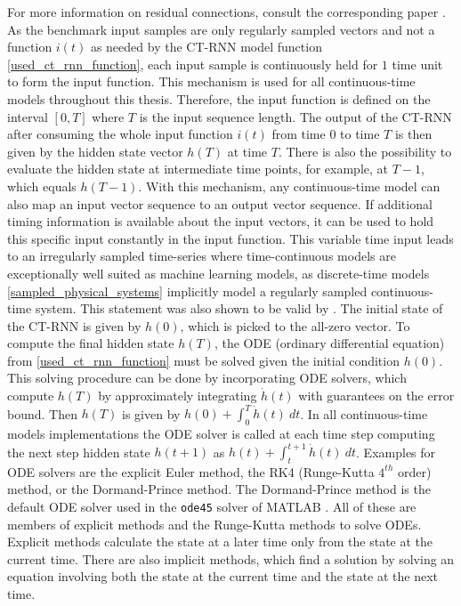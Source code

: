 \documentclass[draft,final]{vutinfth} %
\begin{document}
    For more information on residual connections, consult the corresponding paper \cite{ResNet}.
    As the benchmark input samples are only regularly sampled vectors and not a function $i(t)$ as needed by the CT-RNN model function \ref{used_ct_rnn_function}, each input sample is continuously held for $1$ time unit to form the input function.
    This mechanism is used for all continuous-time models throughout this thesis.
    Therefore, the input function is defined on the interval $[0, T]$ where $T$ is the input sequence length.
    The output of the CT-RNN after consuming the whole input function $i(t)$ from time $0$ to time $T$ is then given by the hidden state vector $h(T)$ at time $T$.
    There is also the possibility to evaluate the hidden state at intermediate time points, for example, at $T-1$, which equals $h(T-1)$.
    With this mechanism, any continuous-time model can also map an input vector sequence to an output vector sequence.
    If additional timing information is available about the input vectors, it can be used to hold this specific input constantly in the input function.
    This variable time input leads to an irregularly sampled time-series where time-continuous models are exceptionally well suited as machine learning models, as discrete-time models \ref{sampled_physical_systems} implicitly model a regularly sampled continuous-time system.
    This statement was also shown to be valid by \cite{ODELSTM}.
    The initial state of the CT-RNN is given by $h(0)$, which is picked to the all-zero vector.
    To compute the final hidden state $h(T)$, the ODE (ordinary differential equation) from \ref{used_ct_rnn_function} must be solved given the initial condition $h(0)$.
    This solving procedure can be done by incorporating ODE solvers, which compute $h(T)$ by approximately integrating $\dot h(t)$ with guarantees on the error bound.
    Then $h(T)$ is given by $h(0) + \int_0^T{\dot h(t)}~dt$.
    In all continuous-time models implementations the ODE solver is called at each time step computing the next step hidden state $h(t+1)$ as $h(t) + \int_t^{t+1}{\dot h(t)}~dt$.
    Examples for ODE solvers are the explicit Euler method, the RK4 (Runge-Kutta $4^{th}$ order) method, or the Dormand-Prince method.
    The Dormand-Prince method is the default ODE solver used in the \texttt{ode45} solver of MATLAB \cite{MATLAB}.
    All of these are members of explicit methods and the Runge-Kutta methods to solve ODEs. Explicit methods calculate the state at a later time only from the state at the current time.
    There are also implicit methods, which find a solution by solving an equation involving both the state at the current time and the state at the next time.
\end{document}
